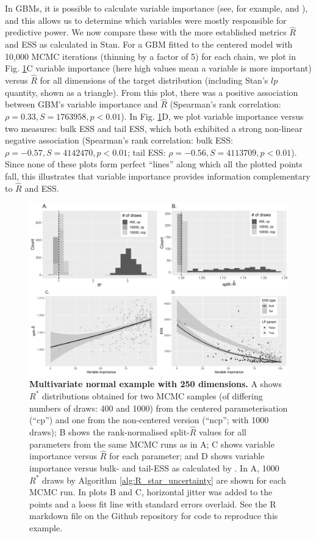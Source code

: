 \documentclass{article}
\begin{document}
In GBMs, it is possible to calculate variable importance (see, for example, \cite{friedman2001greedy} and \cite{greenwell2019package}), and this allows us to determine which variables were mostly responsible for predictive power. We now compare these with the more established metrics $\widehat{R}$ and ESS as calculated in Stan. For a GBM fitted to the centered model with 10,000 MCMC iterations (thinning by a factor of 5) for each chain, we plot in Fig. \ref{fig:mvt}C variable importance (here high values mean a variable is more important) versus $\widehat{R}$ for all dimensions of the target distribution (including Stan's $lp$ quantity, shown as a triangle). From this plot, there was a positive association between GBM's variable importance and $\widehat{R}$ (Spearman's rank correlation: $\rho=0.33, S=1763958, p<0.01$). In Fig.  \ref{fig:mvt}D, we plot variable importance versus two measures: bulk ESS and tail ESS, which both exhibited a strong non-linear negative association (Spearman's rank correlation: bulk ESS: $\rho=-0.57, S=4142470, p<0.01$; tail ESS: $\rho=-0.56, S=4113709, p<0.01$). Since none of these plots form perfect ``lines'' along which all the plotted points fall, this illustrates that variable importance provides information complementary to $\widehat{R}$ and ESS.

\begin{figure}[!htb]
	\centerline{\includegraphics[width=1\textwidth]{../output/mvt_three.pdf}}
	\caption{\textbf{Multivariate normal example with 250 dimensions.} A shows $R^*$ distributions obtained for two MCMC samples (of differing numbers of draws: 400 and 1000) from the centered parameterisation (``cp'') and one from the non-centered version (``ncp''; with 1000 draws); B shows the rank-normalised split-$\widehat{R}$ values for all parameters from the same MCMC runs as in A; C shows variable importance versus $\widehat{R}$ for each parameter; and D shows variable importance versus bulk- and tail-ESS as calculated by \cite{vehtari2019rank}. In A, 1000 $R^*$ draws by Algorithm \ref{alg:R_star_uncertainty} are shown for each MCMC run. In plots B and C, horizontal jitter was added to the points and a loess fit line with standard errors overlaid. See the R markdown file on the Github repository for code to reproduce this example.}
	\label{fig:mvt}
\end{figure}
\end{document}
